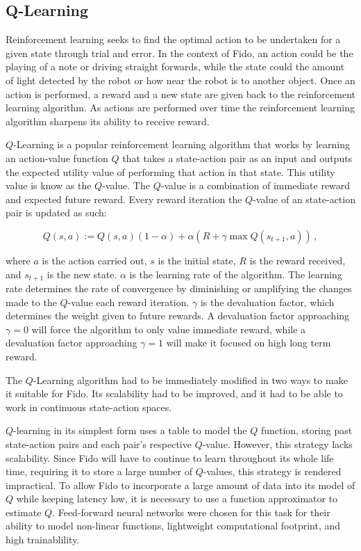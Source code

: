 \subsection{Q-Learning}

Reinforcement learning seeks to find the optimal action to be undertaken for a given state through trial and error. In the context of Fido, an action could be the playing of a note or driving straight forwards, while the state could the amount of light detected by the robot or how near the robot is to another object. Once an action is performed, a reward and a new state are given back to the reinforcement learning algorithm.  As actions are performed over time the reinforcement learning algorithm sharpens its ability to receive reward.

$Q$-Learning \cite{watkins} is a popular reinforcement learning algorithm that works by learning an action-value function $Q$ that takes a state-action pair as an input and outputs the expected utility value of performing that action in that state. This utility value is know as the $Q$-value. The $Q$-value is a combination of immediate reward and expected future reward. Every reward iteration the $Q$-value of an state-action pair is updated as such:

\begin{equation}
	Q(s, a) := Q(s, a)(1 - \alpha) + \alpha(R + \gamma \max Q(s_{t+1}, a))
	\,,
	\label{equ::updateqlearn}
\end{equation}

\noindent
where $a$ is the action carried out, $s$ is the initial state, $R$ is the reward received, and $s_{t+1}$ is the new state. $\alpha$ is the learning rate of the algorithm. The learning rate determines the rate of convergence by diminishing or amplifying the changes made to the $Q$-value each reward iteration. $\gamma$ is the devaluation factor, which determines the weight given to future rewards. A devaluation factor approaching $\gamma=0$ will force the algorithm to only value immediate reward, while a devaluation factor approaching $\gamma=1$ will make it focused on high long term reward.

The $Q$-Learning algorithm had to be immediately modified in two ways to make it suitable for Fido. Its scalability had to be improved, and it had to be able to work in continuous state-action spaces.   

$Q$-learning in its simplest form uses a table to model the $Q$ function, storing past state-action pairs and each pair's respective $Q$-value.  However, this strategy lacks scalability. Since Fido will have to continue to learn throughout its whole life time, requiring it to store a large number of $Q$-values, this strategy is rendered impractical. To allow Fido to incorporate a large amount of data into its model of $Q$ while keeping latency low, it is necessary to use a function approximator to estimate $Q$.  Feed-forward neural networks were chosen for this task for their ability to model non-linear functions, lightweight computational footprint, and high trainablility.

